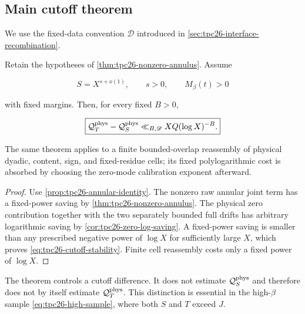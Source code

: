 \subsection{Main cutoff theorem}

We use the fixed-data convention \(\mathscr D\) introduced in
\cref{sec:tpc26-interface-recombination}.

\begin{theorem}
\label{thm:tpc26-cutoff-stability}
Retain the hypotheses of \cref{thm:tpc26-nonzero-annulus}.  Assume

\begin{equation}
 S=X^{s+o(1)},
 \qquad s>0,
 \qquad
 M_\beta(t)>0
 \label{eq:tpc26-main-hypotheses}
\end{equation}

with fixed margins.  Then, for every fixed \(B>0\),

\begin{equation}
 \boxed{
 \mathcal Q_T^{\rm phys}-\mathcal Q_S^{\rm phys}
 \ll_{B,\mathscr D}XQ(\log X)^{-B}.}
 \label{eq:tpc26-cutoff-stability}
\end{equation}

The same theorem applies to a finite bounded-overlap reassembly of
physical dyadic, content, sign, and fixed-residue cells; its fixed
polylogarithmic cost is absorbed by choosing the zero-mode calibration
exponent afterward.
\end{theorem}

\begin{proof}
Use \cref{prop:tpc26-annular-identity}.  The nonzero raw annular joint
term has a fixed-power saving by
\cref{thm:tpc26-nonzero-annulus}.  The physical zero contribution
together with the two separately bounded full drifts has arbitrary
logarithmic saving by \cref{cor:tpc26-zero-log-saving}.  A fixed-power
saving is smaller than any
prescribed negative power of \(\log X\) for sufficiently large \(X\),
which proves \eqref{eq:tpc26-cutoff-stability}.  Finite cell reassembly
costs only a fixed power of \(\log X\).
\end{proof}

\begin{remark}
\label{rem:tpc26-cutoff-vs-value}
The theorem controls a cutoff difference.  It does not estimate
\(\mathcal Q_S^{\rm phys}\) and therefore does not by itself estimate
\(\mathcal Q_T^{\rm phys}\).  This distinction is essential in the
high-\(\beta\) sample \eqref{eq:tpc26-high-sample}, where both \(S\)
and \(T\) exceed \(J\).
\end{remark}

